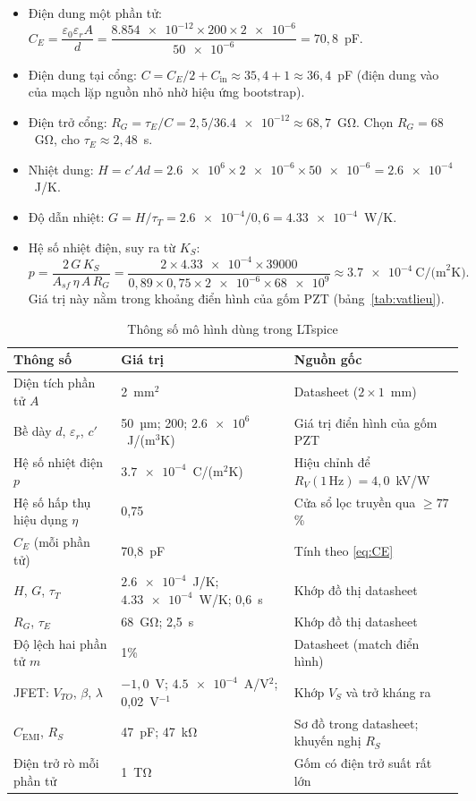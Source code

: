 \begin{itemize}
  \item Điện dung một phần tử: $C_E = \dfrac{\varepsilon_0\varepsilon_r A}{d} = \dfrac{\num{8.854e-12}\times 200\times \num{2e-6}}{\num{50e-6}} = 70{,}8$~pF.
  \item Điện dung tại cổng: $C = C_E/2 + C_\text{in} \approx 35{,}4 + 1 \approx 36{,}4$~pF (điện dung vào của mạch lặp nguồn nhỏ nhờ hiệu ứng bootstrap).
  \item Điện trở cổng: $R_G = \tau_E/C = 2{,}5/\num{36.4e-12} \approx 68{,}7$~GΩ. Chọn $R_G = 68$~GΩ, cho $\tau_E \approx 2{,}48$~s.
  \item Nhiệt dung: $H = c'Ad = \num{2.6e6}\times\num{2e-6}\times\num{50e-6} = \num{2.6e-4}$~J/K.
  \item Độ dẫn nhiệt: $G = H/\tau_T = \num{2.6e-4}/0{,}6 = \num{4.33e-4}$~W/K.
  \item Hệ số nhiệt điện, suy ra từ $K_S$:
  \begin{equation*}
    p = \frac{2\,G\,K_S}{A_{sf}\,\eta\,A\,R_G} = \frac{2\times\num{4.33e-4}\times\num{39000}}{0{,}89\times0{,}75\times\num{2e-6}\times\num{68e9}} \approx \num{3.7e-4}~\text{C/(m}^2\text{K)}.
  \end{equation*}
  Giá trị này nằm trong khoảng điển hình của gốm PZT (bảng~\ref{tab:vatlieu}).
\end{itemize}

\begin{table}[!htb]
\centering
\caption{Thông số mô hình \PYD{} dùng trong LTspice}
\label{tab:thongsomohinh}
\small
\begin{tabularx}{\textwidth}{@{}p{4.6cm}p{2.6cm}L@{}}
\toprule
\textbf{Thông số} & \textbf{Giá trị} & \textbf{Nguồn gốc} \\ \midrule
Diện tích phần tử $A$ & 2~mm$^2$ & Datasheet ($2\times1$~mm) \\
Bề dày $d$, $\varepsilon_r$, $c'$ & 50~µm; 200; $\num{2.6e6}$~J/(m$^3$K) & Giá trị điển hình của gốm PZT \\
Hệ số nhiệt điện $p$ & $\num{3.7e-4}$~C/(m$^2$K) & Hiệu chỉnh để $R_V(1\,\text{Hz}) = 4{,}0$~kV/W \\
Hệ số hấp thụ hiệu dụng $\eta$ & 0,75 & Cửa sổ lọc truyền qua $\ge 77$\% \\
$C_E$ (mỗi phần tử) & 70,8~pF & Tính theo \eqref{eq:CE} \\
$H$, $G$, $\tau_T$ & $\num{2.6e-4}$~J/K; $\num{4.33e-4}$~W/K; 0,6~s & Khớp đồ thị datasheet \\
$R_G$, $\tau_E$ & 68~GΩ; 2,5~s & Khớp đồ thị datasheet \\
Độ lệch hai phần tử $m$ & 1\% & Datasheet (match điển hình) \\
JFET: $V_{TO}$, $\beta$, $\lambda$ & $-1{,}0$~V; $\num{4.5e-4}$~A/V$^2$; 0,02~V$^{-1}$ & Khớp $V_S$ và trở kháng ra \\
$C_\text{EMI}$, $R_S$ & 47~pF; 47~kΩ & Sơ đồ trong datasheet; khuyến nghị $R_S$ \\
Điện trở rò mỗi phần tử & 1~TΩ & Gốm có điện trở suất rất lớn \\
\bottomrule
\end{tabularx}
\end{table}

